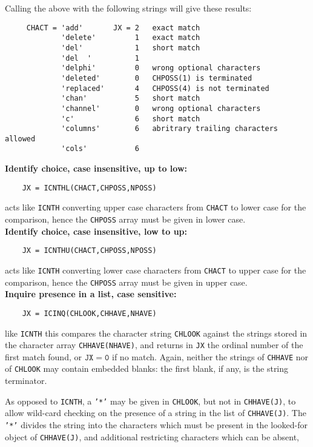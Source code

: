 Calling the above with the following strings will give these results:
\begin{verbatim}
     CHACT = 'add'       JX = 2   exact match
             'delete'         1   exact match
             'del'            1   short match
             'del  '          1
             'delphi'         0   wrong optional characters
             'deleted'        0   CHPOSS(1) is terminated
             'replaced'       4   CHPOSS(4) is not terminated
             'chan'           5   short match
             'channel'        0   wrong optional characters
             'c'              6   short match
             'columns'        6   abritrary trailing characters allowed
             'cols'           6
\end{verbatim}
{\bf Identify choice, case insensitive, up to low:}
\begin{verbatim}
    JX = ICNTHL(CHACT,CHPOSS,NPOSS)
\end{verbatim}
acts like {\tt ICNTH} converting upper case characters
from {\tt CHACT} to lower case for the comparison,
hence the {\tt CHPOSS} array must be given in lower case.
\\[2mm]
{\bf Identify choice, case insensitive, low to up:}
\begin{verbatim}
    JX = ICNTHU(CHACT,CHPOSS,NPOSS)
\end{verbatim}
acts like {\tt ICNTH} converting lower case characters
from {\tt CHACT} to upper case for the comparison,
hence the {\tt CHPOSS} array must be given in upper case. \\[2mm]
\newpage
{\bf Inquire presence in a list, case sensitive:}
\begin{verbatim}
    JX = ICINQ(CHLOOK,CHHAVE,NHAVE)
\end{verbatim}
like {\tt ICNTH} this compares the character string {\tt CHLOOK}
against the strings stored in the character array {\tt CHHAVE(NHAVE)},
and returns in {\tt JX} the ordinal number of the first match found,
or $\mathtt{JX=0}$ if no match.
Again, neither the strings of {\tt CHHAVE} nor of {\tt CHLOOK}
may contain embedded blanks: the first blank, if any,
is the string terminator.
\par
As opposed to {\tt ICNTH}, a {\tt '*'} may be given in {\tt CHLOOK},
but not in {\tt CHHAVE(J)}, to allow wild-card checking on the presence
of a string in the list of {\tt CHHAVE(J)}.
The {\tt '*'} divides the string into the characters which
must be present in the looked-for object of {\tt CHHAVE(J)},
and additional restricting characters which can be absent,

